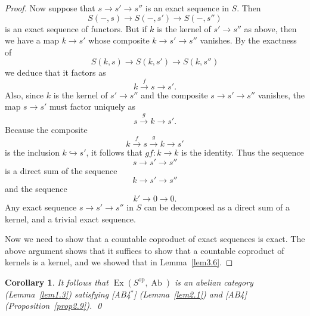 \documentclass[11pt,a4paper]{article}
\theoremstyle{plain}
\newtheorem{corollary}[theorem]{Corollary}
\theoremstyle{definition}
\DeclareMathOperator{\Ex}{Ex}
\DeclareMathOperator{\Ab}{Ab}
\newcommand{\op}{\mathrm{op}}
\numberwithin{equation}{section}
\begin{document}
\begin{proof}
Now suppose that $s \to s' \to s''$ is an exact sequence in $S$. Then
\begin{equation*}
S(-,s) \longrightarrow S(-,s') \longrightarrow S(-,s'')
\end{equation*}
is an exact sequence of functors. But if $k$ is the kernel of $s' \to s''$ as above, then we have a map $k \to s'$ whose composite $k \to s' \to s''$ vanishes. By the exactness of
\begin{equation*}
S(k,s) \longrightarrow S(k,s') \longrightarrow S(k,s'')
\end{equation*}
we deduce that it factors as
\begin{equation*}
k \xrightarrow{\;f\;} s \longrightarrow s'.
\end{equation*}
Also, since $k$ is the kernel of $s' \to s''$ and the composite $s \to s' \to s''$ vanishes, the map $s \to s'$ must factor uniquely as
\begin{equation*}
s \xrightarrow{\;g\;} k \longrightarrow s'.
\end{equation*}
Because the composite
\begin{equation*}
k \xrightarrow{\;f\;} s \xrightarrow{\;g\;} k \longrightarrow s'
\end{equation*}
is the inclusion $k \hookrightarrow s'$, it follows that $gf: k \to k$ is the identity. Thus the sequence
\begin{equation*}
s \longrightarrow s' \longrightarrow s''
\end{equation*}
is a direct sum of the sequence
\begin{equation*}
k \longrightarrow s' \longrightarrow s''
\end{equation*}
and the sequence
\begin{equation*}
k' \longrightarrow 0 \longrightarrow 0.
\end{equation*}
Any exact sequence $s \to s' \to s''$ in $S$ can be decomposed as a direct sum of a kernel, and a trivial exact sequence.

Now we need to show that a countable coproduct of exact sequences is exact. The above argument shows that it suffices to show that a countable coproduct of kernels is a kernel, and we showed that in Lemma~\ref{lem3.6}.
\end{proof}

\begin{corollary}\label{cor3.8}
It follows that $\Ex(S^{\op},\Ab)$ is an abelian category (Lemma~\ref{lem1.3}) satisfying [AB4$^{*}$] (Lemma~\ref{lem2.1}) and [AB4] (Proposition~\ref{prop2.9}). \qed
\end{corollary}
\end{document}
